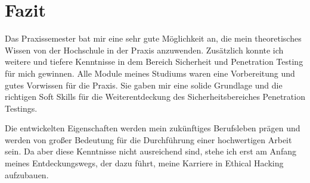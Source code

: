 \section{Fazit}

Das Praxissemester bat mir eine sehr gute Möglichkeit an, die mein theoretisches Wissen von der Hochschule in der Praxis anzuwenden. Zusätzlich konnte ich weitere und tiefere Kenntnisse in dem Bereich Sicherheit und Penetration Testing für mich gewinnen. Alle Module meines Studiums waren eine Vorbereitung und gutes Vorwissen für die Praxis. Sie gaben mir eine solide Grundlage und die richtigen Soft Skills für die Weiterentdeckung des Sicherheitsbereiches Penetration Testings. 

Die entwickelten Eigenschaften werden mein zukünftiges Berufsleben prägen und werden von großer Bedeutung für die Durchführung einer hochwertigen Arbeit sein. Da aber diese Kenntnisse nicht ausreichend sind, stehe ich erst am Anfang meines Entdeckungswegs, der dazu führt, meine Karriere in Ethical Hacking aufzubauen.